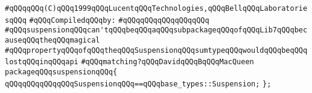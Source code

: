 \label{src/lib/std/src/nj/suspension.pkg}
\verb|#qQQqqQQq(C)qQQq1999qQQqLucentqQQqTechnologies,qQQqBellqQQqLaboratoriesqQQq|\newline
\newline
\verb|#qQQqCompiledqQQqby:|\newline
\verb|#qQQqqQQqqQQqqQQqqQQq|\newline
\newline
\verb|#qQQqsuspensionqQQqcan'tqQQqbeqQQqaqQQqsubpackageqQQqofqQQqLib7qQQqbecauseqQQqtheqQQqmagical|\newline
\verb|#qQQqpropertyqQQqofqQQqtheqQQqSuspensionqQQqsumtypeqQQqwouldqQQqbeqQQqlostqQQqinqQQqapi|\newline
\verb|#qQQqmatching?qQQqDavidqQQqBqQQqMacQueen|\newline
\newline
\verb|packageqQQqsuspensionqQQq{|\newline
\newline
\verb|qQQqqQQqqQQqqQQqSuspensionqQQq==qQQqbase_types::Suspension;|\newline
\verb|};|\newline
\newline

